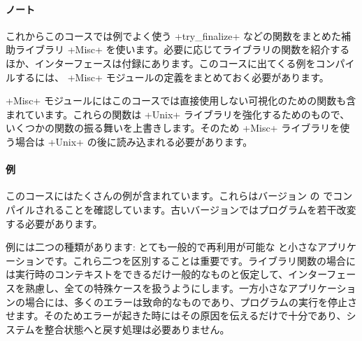 \paragraph{ノート}

これからこのコースでは例でよく使う \ml+try_finalize+ などの関数をまとめた補助ライブラリ \ml+Misc+ を使います。必要に応じてライブラリの関数を紹介するほか、インターフェースは付録にあります。このコースに出てくる例をコンパイルするには、 \ml+Misc+ モジュールの定義をまとめておく必要があります。

\ml+Misc+ モジュールにはこのコースでは直接使用しない可視化のための関数も含まれています。これらの関数は \ml+Unix+ ライブラリを強化するためのもので、いくつかの関数の振る舞いを上書きします。そのため \ml+Misc+ ライブラリを使う場合は \ml+Unix+ の後に読み込まれる必要があります。

\paragraph{例}

このコースにはたくさんの例が含まれています。これらはバージョン \ocamlversion の \ocaml でコンパイルされることを確認しています。古いバージョンではプログラムを若干改変する必要があります。

例には二つの種類があります: とても一般的で再利用が可能な  と小さなアプリケーションです。これら二つを区別することは重要です。ライブラリ関数の場合には実行時のコンテキストをできるだけ一般的なものと仮定して、インターフェースを熟慮し、全ての特殊ケースを扱うようにします。一方小さなアプリケーションの場合には、多くのエラーは致命的なものであり、プログラムの実行を停止させます。そのためエラーが起きた時にはその原因を伝えるだけで十分であり、システムを整合状態へと戻す処理は必要ありません。
